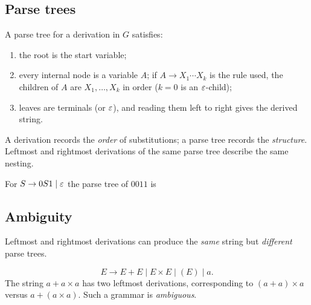 \subsection{Parse trees}
\begin{definition}
A parse tree for a derivation in $G$ satisfies:
\begin{enumerate}
  \item the root is the start variable;
  \item every internal node is a variable $A$; if $A\to X_1\cdots X_k$ is the
        rule used, the children of $A$ are $X_1,\ldots,X_k$ in order
        ($k=0$ is an $\varepsilon$-child);
  \item leaves are terminals (or $\varepsilon$), and reading them left to right gives
        the derived string.
\end{enumerate}
\end{definition}
A derivation records the \emph{order} of substitutions; a parse tree records
the \emph{structure}. Leftmost and rightmost derivations of the same parse tree
describe the same nesting.

\begin{example}
For $S\to 0S1\mid\varepsilon$ the parse tree of $0011$ is
\begin{center}
\end{center}
\end{example}

\subsection{Ambiguity}
Leftmost and rightmost derivations can produce the \emph{same} string but
\emph{different} parse trees.

\begin{example}
\[
  E\to E+E\mid E\times E\mid (E)\mid a.
\]
The string $a+a\times a$ has two leftmost derivations, corresponding to
$(a+a)\times a$ versus $a+(a\times a)$. Such a grammar is \emph{ambiguous}.
\end{example}

